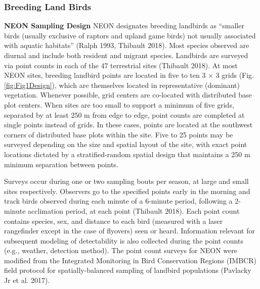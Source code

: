 \documentclass[
  12pt,
]{article}
\begin{document}
\hypertarget{breeding-land-birds}{%
\subsubsection{Breeding Land Birds}\label{breeding-land-birds}}

\textbf{NEON Sampling Design} NEON designates breeding landbirds as ``smaller birds (usually exclusive of raptors and upland game birds) not usually associated with aquatic habitats'' (Ralph 1993, Thibault 2018). Most species observed are diurnal and include both resident and migrant species. Landbirds are surveyed via point counts in each of the 47 terrestrial sites (Thibault 2018). At most NEON sites, breeding landbird points are located in five to ten 3 \(\times\) 3 grids (Fig. \ref{fig:Fig1Design}), which are themselves located in representative (dominant) vegetation. Whenever possible, grid centers are co-located with distributed base plot centers. When sites are too small to support a minimum of five grids, separated by at least 250 m from edge to edge, point counts are completed at single points instead of grids. In these cases, points are located at the southwest corners of distributed base plots within the site. Five to 25 points may be surveyed depending on the size and spatial layout of the site, with exact point locations dictated by a stratified-random spatial design that maintains a 250 m minimum separation between points.

Surveys occur during one or two sampling bouts per season, at large and small sites respectively. Observers go to the specified points early in the morning and track birds observed during each minute of a 6-minute period, following a 2-minute acclimation period, at each point (Thibault 2018). Each point count contains species, sex, and distance to each bird (measured with a laser rangefinder except in the case of flyovers) seen or heard. Information relevant for subsequent modeling of detectability is also collected during the point counts (e.g., weather, detection method). The point count surveys for NEON were modified from the Integrated Monitoring in Bird Conservation Regions (IMBCR) field protocol for spatially-balanced sampling of landbird populations (Pavlacky Jr et al. 2017).
\end{document}
